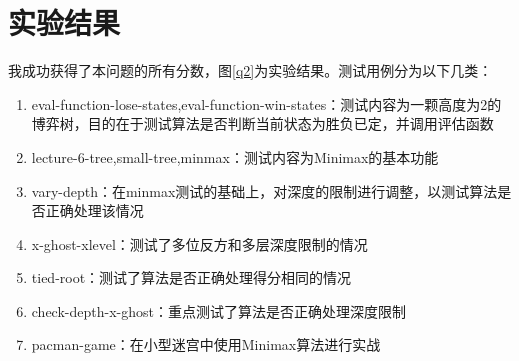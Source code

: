 \section{实验结果}
%
%
我成功获得了本问题的所有分数，图\ref{q2}为实验结果。测试用例分为以下几类：
\begin{enumerate}
    \item eval-function-lose-states,eval-function-win-states：测试内容为一颗高度为2的博弈树，目的在于测试算法是否判断当前状态为胜负已定，并调用评估函数
    \item lecture-6-tree,small-tree,minmax：测试内容为Minimax的基本功能
    \item vary-depth：在minmax测试的基础上，对深度的限制进行调整，以测试算法是否正确处理该情况
    \item x-ghost-xlevel：测试了多位反方和多层深度限制的情况
    \item tied-root：测试了算法是否正确处理得分相同的情况
    \item check-depth-x-ghost：重点测试了算法是否正确处理深度限制
    \item pacman-game：在小型迷宫中使用Minimax算法进行实战
\end{enumerate}
